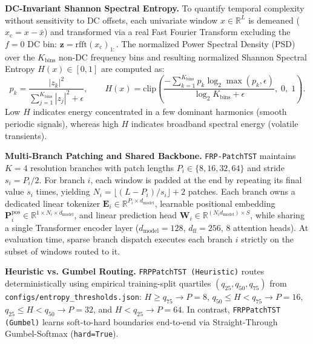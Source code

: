 \documentclass[11pt, letterpaper]{article}
\begin{document}
\textbf{DC-Invariant Shannon Spectral Entropy.} To quantify temporal complexity without sensitivity to DC offsets, each univariate window $x \in \mathbb{R}^L$ is demeaned ($x_{\mathrm{c}} = x - \bar{x}$) and transformed via a real Fast Fourier Transform excluding the $f=0$ DC bin: $\mathbf{z} = \mathrm{rfft}(x_{\mathrm{c}})_{1:}$. The normalized Power Spectral Density (PSD) over the $K_{\mathrm{bins}}$ non-DC frequency bins and resulting normalized Shannon Spectral Entropy $H(x) \in [0, 1]$ are computed as:
\begin{equation}
  p_k = \frac{|z_k|^2}{\sum_{j=1}^{K_{\mathrm{bins}}} |z_j|^2 + \epsilon}, \qquad
  H(x) = \mathrm{clip}\!\left(\frac{-\sum_{k=1}^{K_{\mathrm{bins}}} p_k \log_2 \max(p_k, \epsilon)}{\log_2 K_{\mathrm{bins}} + \epsilon},\; 0,\; 1\right).
  \label{eq:entropy}
\end{equation}
Low $H$ indicates energy concentrated in a few dominant harmonics (smooth periodic signals), whereas high $H$ indicates broadband spectral energy (volatile transients).

\textbf{Multi-Branch Patching and Shared Backbone.} \texttt{FRP-PatchTST} maintains $K=4$ resolution branches with patch lengths $P_i \in \{8, 16, 32, 64\}$ and stride $s_i = P_i / 2$. For branch $i$, each window is padded at the end by repeating its final value $s_i$ times, yielding $N_i = \lfloor (L - P_i)/s_i \rfloor + 2$ patches. Each branch owns a dedicated linear tokenizer $\mathbf{E}_i \in \mathbb{R}^{P_i \times d_{\mathrm{model}}}$, learnable positional embedding $\mathbf{P}^{\mathrm{pos}}_i \in \mathbb{R}^{1 \times N_i \times d_{\mathrm{model}}}$, and linear prediction head $\mathbf{W}_i \in \mathbb{R}^{(N_i d_{\mathrm{model}}) \times S}$, while sharing a single Transformer encoder layer ($d_{\mathrm{model}}=128$, $d_{\mathrm{ff}}=256$, $8$ attention heads). At evaluation time, sparse branch dispatch executes each branch $i$ strictly on the subset of windows routed to it.

\textbf{Heuristic vs. Gumbel Routing.} \texttt{FRPPatchTST (Heuristic)} routes deterministically using empirical training-split quartiles $(q_{25}, q_{50}, q_{75})$ from \texttt{configs/entropy\_thresholds.json}: $H \ge q_{75} \to P=8$, $q_{50} \le H < q_{75} \to P=16$, $q_{25} \le H < q_{50} \to P=32$, and $H < q_{25} \to P=64$. In contrast, \texttt{FRPPatchTST (Gumbel)} learns soft-to-hard boundaries end-to-end via Straight-Through Gumbel-Softmax (\texttt{hard=True}).
\end{document}
